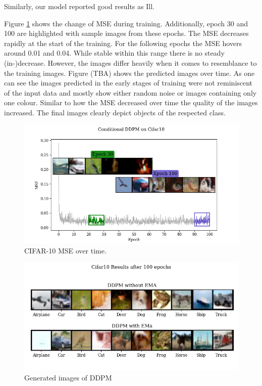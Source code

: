 \documentclass[12pt]{article}
\theoremstyle{plain}
\theoremstyle{definition}
\theoremstyle{remark}
\begin{document}
Similarly, our model reported good results as Ill. 

Figure \ref{fig:cifar10msewithpredictions} shows the change of \ac{MSE} during training. Additionally, epoch 30 and 100 are highlighted with sample images from these epochs. The \ac{MSE} decreases rapidly at the start of the training. For the following epochs the \ac{MSE} hovers around 0.01 and 0.04. While stable within this range there is no steady (in-)decrease. However, the images differ heavily when it comes to resemblance to the training images. 
Figure (TBA) shows the predicted images over time. As one can see the images predicted in the early stages of training  were  not reminiscent of the input data and mostly show either random noise or images containing only one colour. Similar to how the \ac{MSE} decreased over time the quality of the images increased. The final images clearly depict objects of the respected class. 

\begin{figure}[H]
	\centering
	\includegraphics[width=\linewidth]{src/Images/cifar10_mse_with_predictions}
	\caption[\ac{CIFAR-10} \ac{MSE} over time.]{\ac{CIFAR-10} \ac{MSE} over time.}
	\label{fig:cifar10msewithpredictions}
\end{figure}


\begin{figure}[H]
	\centering
	\includegraphics[width=1\linewidth]{src/Images/cifar10_results}
	\caption[Generated \ac{CIFAR-10} images of \ac{DDPM}]{Generated images of \ac{DDPM}}
\label{fig:cifar10results}
\end{figure}
\end{document}
